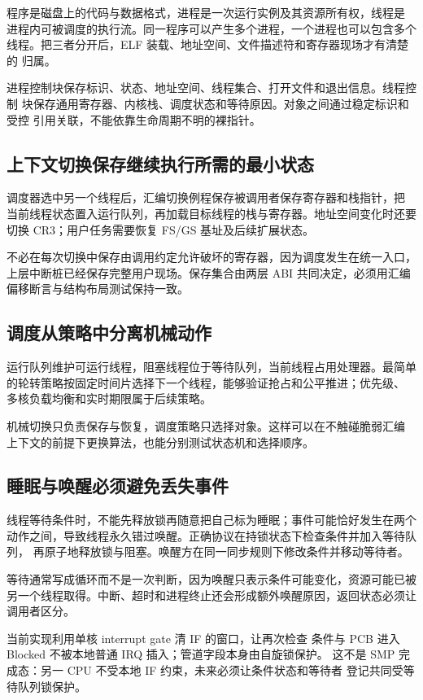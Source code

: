 程序是磁盘上的代码与数据格式，进程是一次运行实例及其资源所有权，线程是
进程内可被调度的执行流。同一程序可以产生多个进程，一个进程也可以包含多个
线程。把三者分开后，ELF 装载、地址空间、文件描述符和寄存器现场才有清楚的
归属。

进程控制块保存标识、状态、地址空间、线程集合、打开文件和退出信息。线程控制
块保存通用寄存器、内核栈、调度状态和等待原因。对象之间通过稳定标识和受控
引用关联，不能依靠生命周期不明的裸指针。

\subsection{上下文切换保存继续执行所需的最小状态}

调度器选中另一个线程后，汇编切换例程保存被调用者保存寄存器和栈指针，把
当前线程状态置入运行队列，再加载目标线程的栈与寄存器。地址空间变化时还要
切换 CR3；用户任务需要恢复 FS/GS 基址及后续扩展状态。

不必在每次切换中保存由调用约定允许破坏的寄存器，因为调度发生在统一入口，
上层中断桩已经保存完整用户现场。保存集合由两层 ABI 共同决定，必须用汇编
偏移断言与结构布局测试保持一致。

\subsection{调度从策略中分离机械动作}

运行队列维护可运行线程，阻塞线程位于等待队列，当前线程占用处理器。最简单
的轮转策略按固定时间片选择下一个线程，能够验证抢占和公平推进；优先级、
多核负载均衡和实时期限属于后续策略。

机械切换只负责保存与恢复，调度策略只选择对象。这样可以在不触碰脆弱汇编
上下文的前提下更换算法，也能分别测试状态机和选择顺序。

\subsection{睡眠与唤醒必须避免丢失事件}

线程等待条件时，不能先释放锁再随意把自己标为睡眠；事件可能恰好发生在两个
动作之间，导致线程永久错过唤醒。正确协议在持锁状态下检查条件并加入等待队列，
再原子地释放锁与阻塞。唤醒方在同一同步规则下修改条件并移动等待者。

等待通常写成循环而不是一次判断，因为唤醒只表示条件可能变化，资源可能已被
另一个线程取得。中断、超时和进程终止还会形成额外唤醒原因，返回状态必须让
调用者区分。

当前实现利用单核  interrupt gate 清 IF 的窗口，让再次检查
条件与 PCB 进入 Blocked 不被本地普通 IRQ 插入；管道字段本身由自旋锁保护。
这不是 SMP 完成态：另一 CPU 不受本地 IF 约束，未来必须让条件状态和等待者
登记共同受等待队列锁保护。

